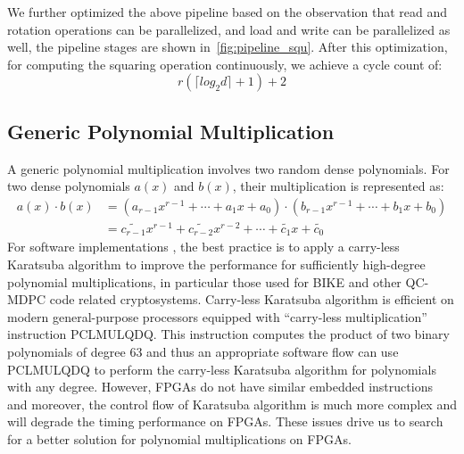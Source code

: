 \documentclass[runningheads]{llncs}
\begin{document}
We further optimized the above pipeline based on the observation
that read and rotation operations can be parallelized,
and load and write can be parallelized as well,
the pipeline stages are shown in~\ref{fig:pipeline_squ}.
After this optimization, for computing the squaring operation continuously, we achieve a cycle count of:
\[
r(\lceil log_2d\rceil+1)+2
\]

\subsection{Generic Polynomial Multiplication}
\label{sub::dense}
A generic polynomial multiplication involves two random dense polynomials.
For two dense polynomials $a(x)$ and $b(x)$, their multiplication is represented as:
\begin{align}
    a(x)\cdot b(x) &= (a_{r-1}x^{r-1}+\cdots + a_{1}x + a_0)\cdot(b_{r-1}x^{r-1}+\cdots + b_{1}x + b_0)\\
    &= \widetilde{c_{r-1}}x^{r-1}+\widetilde{c_{r-2}}x^{r-2}+\cdots + \widetilde{c_{1}}x +\widetilde{c_0}
\end{align}
%
For software implementations \cite{chou2016qcbits,drucker2017toolbox}, the best practice is to apply a carry-less Karatsuba algorithm to improve the performance for sufficiently high-degree polynomial multiplications, in particular those used for BIKE and other QC-MDPC code related cryptosystems. Carry-less Karatsuba algorithm is efficient on modern general-purpose processors equipped with ``carry-less multiplication'' instruction  PCLMULQDQ. This instruction computes the product of two binary polynomials of degree 63 and thus an appropriate software flow can use PCLMULQDQ to perform the carry-less Karatsuba algorithm for polynomials with any degree. However, FPGAs do not have
similar embedded instructions and moreover, the control flow of Karatsuba algorithm 
is much more complex and will degrade the timing performance on FPGAs.
These issues drive us to search for a better solution for polynomial multiplications on FPGAs.
\end{document}

